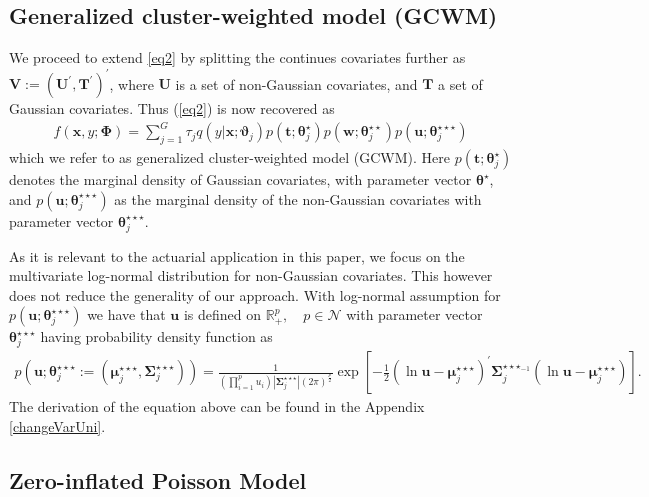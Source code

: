 \documentclass[11pt,letterpaper]{article}
\numberwithin{equation}{section}
\numberwithin{equation}{section}
\numberwithin{equation}{section}
\begin{document}
\subsection{Generalized cluster-weighted model (GCWM) }
We proceed to extend \eqref{eq2} by splitting the  continues covariates further as $\bm{V}:=(\bm U^{'}, \bm T^{'})^{'}$, where $\bm{U}$ is a set of non-Gaussian covariates, and $\bm{T}$ a set of Gaussian  covariates.  Thus (\ref{eq2}) is now recovered as
\begin{align}
 f(\bm x, y; \bm{\Phi})= \sum_{j=1}^{G} \tau_j q(y|\bm{x};\bm{\vartheta}_j)p(\bm{t};\bm{\theta}_j^{\star})p(\bm{w};\bm{\theta}_j^{\star\star})p(\bm{u};\bm{\theta}_j^{\star\star\star})
\label{eq3}
\end{align}
which we refer to as generalized cluster-weighted model (GCWM). Here $p(\bm{t};\bm{\theta}_j^{\star})$ denotes the marginal density of Gaussian covariates, with parameter vector $\bm{\theta}^{\star}$, and $p(\bm{u};\bm{\theta}_j^{\star\star\star})$ as the marginal density of the non-Gaussian covariates with parameter vector $ \bm{ \theta}_j^{\star\star\star} $.


As it is relevant to the actuarial application in this paper, we focus on the multivariate log-normal distribution  for non-Gaussian covariates. This however does not reduce the generality of our approach. With log-normal assumption for $p(\bm{u};\bm{\theta}_j^{\star\star\star})$ we have that $\bm{u}$ is defined on $\mathbb{R}^p_+,\quad p \in \mathcal{N}$ with parameter vector $ \bm{\theta}_j^{\star\star\star} $ having probability density function as
\begin{align*} p \left(  \bm{u}; \bm{\theta}_j^{\star\star\star} := ( \bm{\mu}_j^{\star\star\star} ,\bm{ \Sigma}_j^{\star\star\star } ) \right) = \frac{1}{(\prod_{i=1}^{p}u_{i})|\bm{ \Sigma}_j^{\star\star\star} |(2 \pi)^{\frac{p}{2}}}   \exp\left[-\frac{1}{2}(\ln\bm{ u}-\bm{\mu}_j^{\star\star\star})^{'}\bm{\Sigma}_j^{{\star\star\star}_{-1}}(\ln \bm {u}-\bm{\mu}_j^{\star\star\star})\right].
\end{align*} The derivation of the equation above can be found in the Appendix \ref{changeVarUni}.


\subsection{Zero-inflated Poisson Model}%
\end{document}
